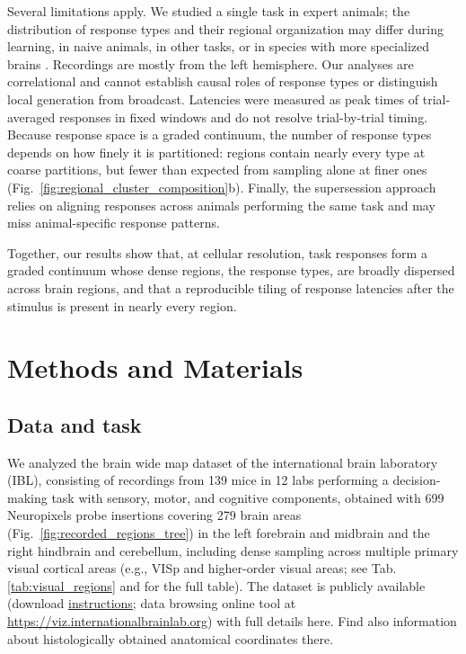 \documentclass[10pt,lineno]{elife}
\begin{document}
Several limitations apply. We studied a single task in expert animals; the distribution of response types and their regional organization may differ during learning, in naive animals, in other tasks, or in species with more specialized brains \cite{kanwisher1997fusiform, huth2016natural}. Recordings are mostly from the left hemisphere. Our analyses are correlational and cannot establish causal roles of response types or distinguish local generation from broadcast. Latencies were measured as peak times of trial-averaged responses in fixed windows and do not resolve trial-by-trial timing. Because response space is a graded continuum, the number of response types depends on how finely it is partitioned: regions contain nearly every type at coarse partitions, but fewer than expected from sampling alone at finer ones (Fig.~\ref{fig:regional_cluster_composition}b). Finally, the supersession approach relies on aligning responses across animals performing the same task and may miss animal-specific response patterns.

Together, our results show that, at cellular resolution, task responses form a graded continuum whose dense regions, the response types, are broadly dispersed across brain regions, and that a reproducible tiling of response latencies after the stimulus is present in nearly every region.

\section{Methods and Materials}

\subsection{Data and task}
We analyzed the brain wide map dataset of the international brain laboratory (IBL), consisting of recordings from 139 mice in 12 labs performing a decision-making task with sensory, motor, and cognitive components, obtained with 699 Neuropixels probe insertions covering 279 brain areas (Fig.~\ref{fig:recorded_regions_tree}) in the left forebrain and midbrain and the right hindbrain and cerebellum, including dense sampling across multiple primary visual cortical areas (e.g., VISp and higher-order visual areas; see Tab.\ref{tab:visual_regions} and \cite{IBLRegionInfo} for the full table). The dataset is publicly available (download \href{https://int-brain-lab.github.io/iblenv/notebooks_external/data_release_brain-widemap.html}{instructions}; data browsing online tool at \url{https://viz.internationalbrainlab.org}) with full details here\cite{international2025brain}. Find also information about histologically obtained anatomical coordinates there.
\end{document}
